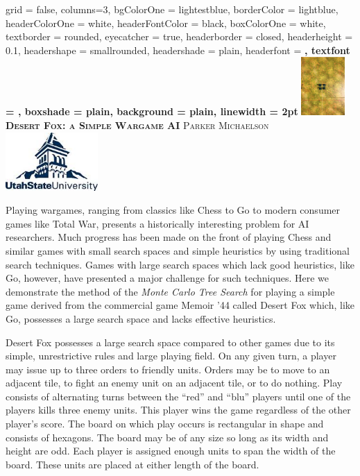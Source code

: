 \documentclass[landscape,final,a0paper,12pt]{baposter}
\begin{document}
\begin{poster}
{
	grid = false,
	columns=3,
	bgColorOne = lightestblue,
	borderColor = lightblue,
	headerColorOne = white,
	headerFontColor = black,
	boxColorOne = white,
	textborder = rounded,
	eyecatcher = true,
	headerborder = closed,
	headerheight = 0.1\textheight,
	headershape = smallrounded,
	headershade = plain,
	headerfont =  \Large\bf\textsc,
	textfont = {\setlength{\parindent}{1.5em}},
	boxshade = plain,
	background = plain,
	linewidth = 2pt
}
{\includegraphics[height=6em]{./images/board_1}}
{\bf\textsc{Desert Fox: a Simple Wargame AI}\vspace{0.5em}}
{\textsc{Parker Michaelson}}
{\includegraphics[height=6em]{./images/logo}}

{
Playing wargames, ranging from classics like Chess to Go to modern consumer games like Total War, presents a historically interesting problem for AI researchers.
Much progress has been made on the front of playing Chess and similar games with small search spaces and simple heuristics by using traditional search techniques.
Games with large search spaces which lack good heuristics, like Go, however, have presented a major challenge for such techniques.
Here we demonstrate the method of the {\it Monte Carlo Tree Search} for playing a simple game derived from the commercial game Memoir '44 called Desert Fox which, like Go, possesses a large search space and lacks effective heuristics.
}

{
Desert Fox possesses a large search space compared to other games due to its simple, unrestrictive rules and large playing field.
On any given turn, a player may issue up to three orders to friendly units.
Orders may be to move to an adjacent tile, to fight an enemy unit on an adjacent tile, or to do nothing.
Play consists of alternating turns between the ``red'' and ``blu'' players until one of the players kills three enemy units.
This player wins the game regardless of the other player's score.
The board on which play occurs is rectangular in shape and consists of hexagons.
The board may be of any size so long as its width and height are odd.
Each player is assigned enough units to span the width of the board.
These units are placed at either length of the board.

}
\end{poster}
\end{document}
